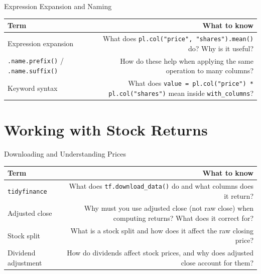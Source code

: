 \documentclass[9pt,aspectratio=169]{beamer}
\begin{document}
\begin{frame}{Expression Expansion and Naming}

\begin{tabular}{@{}lR@{}}
\toprule
\textbf{Term} & \textbf{What to know} \\
\midrule
\alert{Expression expansion} & What does \texttt{pl.col("price", "shares").mean()} do? Why is it useful? \\[0.8em]
\alert{\texttt{.name.prefix()} / \texttt{.name.suffix()}} & How do these help when applying the same operation to many columns? \\[0.8em]
\alert{Keyword syntax} & What does \texttt{value = pl.col("price") * pl.col("shares")} mean inside \texttt{with\_columns}? \\
\bottomrule
\end{tabular}

\end{frame}


\section{Working with Stock Returns}

\begin{frame}{Downloading and Understanding Prices}

\begin{tabular}{@{}lR@{}}
\toprule
\textbf{Term} & \textbf{What to know} \\
\midrule
\alert{\texttt{tidyfinance}} & What does \texttt{tf.download\_data()} do and what columns does it return? \\[0.8em]
\alert{Adjusted close} & Why must you use adjusted close (not raw close) when computing returns? What does it correct for? \\[0.8em]
\alert{Stock split} & What is a stock split and how does it affect the raw closing price? \\[0.8em]
\alert{Dividend adjustment} & How do dividends affect stock prices, and why does adjusted close account for them? \\
\bottomrule
\end{tabular}

\end{frame}
\end{document}
